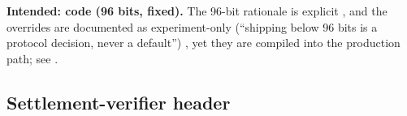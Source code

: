 \begin{specdelta}
\textbf{Intended: code (96 bits, fixed).} The 96-bit rationale is explicit
, and the overrides are documented as
experiment-only (``shipping below 96 bits is a protocol decision, never a
default'') , yet they are
compiled into the production path; see .
\end{specdelta}

\subsection{Settlement-verifier header}
\label{subsec:delta-whirhdr}

